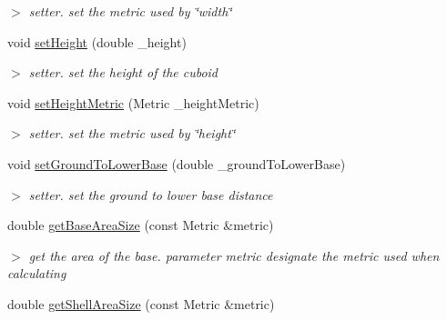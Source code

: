 \begin{DoxyCompactItemize}
\begin{DoxyCompactList}\small\item\em $>$ setter. set the metric used by \char`\"{}width\char`\"{} \end{DoxyCompactList}\item 
\hypertarget{classCuboid_a2bb58d4f8399ac1bff23edde5648a827}{void \hyperlink{classCuboid_a2bb58d4f8399ac1bff23edde5648a827}{set\-Height} (double \-\_\-height)}\label{classCuboid_a2bb58d4f8399ac1bff23edde5648a827}

\begin{DoxyCompactList}\small\item\em $>$ setter. set the height of the cuboid \end{DoxyCompactList}\item 
\hypertarget{classCuboid_a1eb75213e981310ea10f153da2b21a5f}{void \hyperlink{classCuboid_a1eb75213e981310ea10f153da2b21a5f}{set\-Height\-Metric} (\-Metric \-\_\-height\-Metric)}\label{classCuboid_a1eb75213e981310ea10f153da2b21a5f}

\begin{DoxyCompactList}\small\item\em $>$ setter. set the metric used by \char`\"{}height\char`\"{} \end{DoxyCompactList}\item 
\hypertarget{classCuboid_a77e5163fee5733c735acc57b6e9cc9f5}{void \hyperlink{classCuboid_a77e5163fee5733c735acc57b6e9cc9f5}{set\-Ground\-To\-Lower\-Base} (double \-\_\-ground\-To\-Lower\-Base)}\label{classCuboid_a77e5163fee5733c735acc57b6e9cc9f5}

\begin{DoxyCompactList}\small\item\em $>$ setter. set the ground to lower base distance \end{DoxyCompactList}\item 
\hypertarget{classCuboid_a34979a3e201b3a2131039702ae4120cc}{double \hyperlink{classCuboid_a34979a3e201b3a2131039702ae4120cc}{get\-Base\-Area\-Size} (const \-Metric \&metric)}\label{classCuboid_a34979a3e201b3a2131039702ae4120cc}

\begin{DoxyCompactList}\small\item\em $>$ get the area of the base. parameter metric designate the metric used when calculating \end{DoxyCompactList}\item 
\hypertarget{classCuboid_a10d733aa5ce514deac6ee0fca510695c}{double \hyperlink{classCuboid_a10d733aa5ce514deac6ee0fca510695c}{get\-Shell\-Area\-Size} (const \-Metric \&metric)}\label{classCuboid_a10d733aa5ce514deac6ee0fca510695c}


\end{DoxyCompactItemize}
